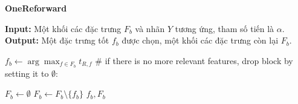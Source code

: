 \begin{breakablealgorithm}
	\caption{\textbf{OneReforward} }\label{alg:or}
	\noindent\textbf{Input:} Một khối các đặc trưng $F_b$ và nhãn $Y$ tương ứng, tham số tiến là $\alpha$.
	\textbf{Output:} Một đặc trưng tốt $f_b$ được chọn, một khối các đặc trưng còn lại $F_b$.
	\begin{algorithmic}[1]
		\State $f_b \gets \arg\max_{f\in F_b}	t_{R,f}	$
		\State \# if there is no more relevant features, drop block by setting it to  $\emptyset$:
		
		\State $F_b\gets \emptyset$
		\Else
		\State $F_b \leftarrow F_b\setminus\{f_b\}$
		\EndIf
		\State \Return $f_b,F_b$
	\end{algorithmic}
\end{breakablealgorithm}